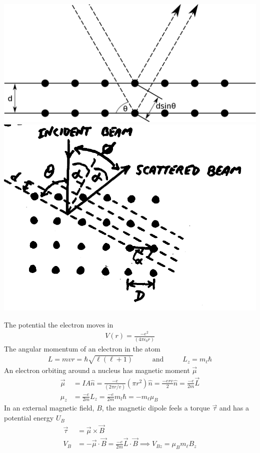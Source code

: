 \begin{center}
	\includegraphics[scale=0.2]{./Images/Diagrams/1280px-BraggPlaneDiffraction.png} \includegraphics[scale=0.25]{./Images/Diagrams/crystalscattering.png}
\end{center}





The potential the electron moves in
\begin{align}
V(r)=\frac{-e^2}{(4\pi \epsilon_0r)}
\end{align}
The angular momentum of an electron in the atom
\begin{align}
L=mvr=\hbar\sqrt{\ell(\ell+1)} \hspace{1cm}\textrm{ and }\hspace{1cm}
L_z=m_\ell\hbar 
\end{align}
An electron orbiting around a nucleus has magnetic moment $\vec{\mu}$
\begin{align}
\vec{\mu}&=IA\hat{n}=\frac{-e}{(2\pi r/v)}(\pi r^2)\hat{n}=\frac{-erv}{2}\hat{n}=\frac{-e}{2m}\vec{L} \\
\mu_z&=\frac{-e}{2m}L_z=\frac{-e}{2m}m_l\hbar=-m_\ell\mu_B 
\end{align}
In an external magnetic field, $B$, the
magnetic dipole feels a torque $\vec{\tau}$ and has a potential energy $U_B$
\begin{align}
\vec{\tau}&=\vec{\mu}\times \vec{B} \\
V_B&=-\vec{\mu}\cdot \vec{B} = \frac{-e}{2m}\vec{L} \cdot \vec{B} \implies V_{Bz}= \mu_B m_\ell B_z
\end{align}
